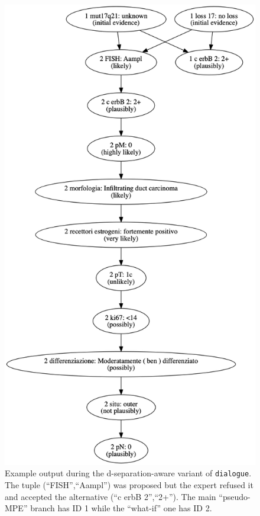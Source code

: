 \begin{figure}[htbp]
\centerline{\includegraphics[scale=0.2]{methodology/images/alternative-explanation-tree-example}}
\caption{Example output during the d-separation-aware variant of \texttt{dialogue}.
	The tuple (\enquote{FISH},\enquote{Aampl}) was proposed but the expert refused it and accepted the alternative (\enquote{c erbB 2},\enquote{2+}).
	The main \enquote{pseudo-MPE} branch has ID 1 while the \enquote{what-if} one has ID 2.}
\label{fig:alternative-branch}
\end{figure}

